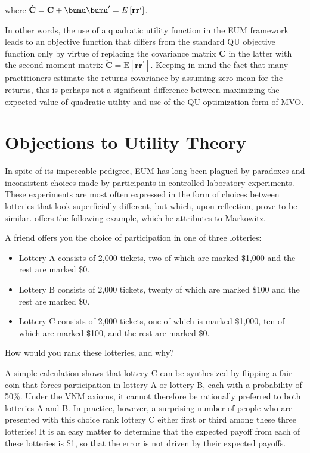 \documentclass[graybox,envcountchap,sectrefs]{svmono}\usepackage[]{graphicx}\usepackage[]{xcolor}
\begin{document}
\begin{appendices}
where $\check{\mathbf{C}}=\mathbf{C}+\bumu\bumu^{\prime}=E\left[\mathbf{r}\mathbf{r}^{\prime}\right]$.

In other words, the use of a quadratic utility function in the EUM
framework leads to an objective function that differs from the standard
QU objective function only by virtue of replacing the covariance matrix
$\mathbf{C}$ in the latter with the second moment matrix $\check{\mathbf{C}}=\mathrm{E}\left[\mathbf{r}\mathbf{r}^{\prime}\right]$.
Keeping in mind the fact that many practitioners estimate the returns
covariance by assuming zero mean for the returns, this is perhaps
not a significant difference between maximizing the expected value
of quadratic utility and use of the QU optimization form of MVO. 

\section{Objections to Utility Theory}

In spite of its impeccable pedigree, EUM has long been plagued by
paradoxes and inconsistent choices made by participants in controlled
laboratory experiments. These experiments are most often expressed
in the form of choices between lotteries that look superficially different,
but which, upon reflection, prove to be similar. \citet{Alchian1953}
offers the following example, which he attributes to Markowitz.

A friend offers you the choice of participation in one of three lotteries:
\begin{itemize}
\item Lottery A consists of 2,000 tickets, two of which are marked \$1,000
and the rest are marked \$0.
\item Lottery B consists of 2,000 tickets, twenty of which are marked \$100
and the rest are marked \$0.
\item Lottery C consists of 2,000 tickets, one of which is marked \$1,000,
ten of which are marked \$100, and the rest are marked \$0.
\end{itemize}
How would you rank these lotteries, and why? 

A simple calculation shows that lottery C can be synthesized by flipping
a fair coin that forces participation in lottery A or lottery B, each
with a probability of 50\%. Under the VNM axioms, it cannot therefore
be rationally preferred to both lotteries A and B. In practice, however,
a surprising number of people who are presented with this choice rank
lottery C either first or third among these three lotteries! It is
an easy matter to determine that the expected payoff from each of
these lotteries is \$1, so that the error is not driven by their expected
payoffs.


\end{appendices}
\end{document}
